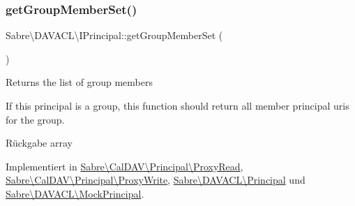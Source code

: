 \mbox{\label{interface_sabre_1_1_d_a_v_a_c_l_1_1_i_principal_ad9f9e4ed25ec5ec9325288b076cdd09f}} 
\subsubsection{\texorpdfstring{get\+Group\+Member\+Set()}{getGroupMemberSet()}}
{\footnotesize\ttfamily Sabre\textbackslash{}\+D\+A\+V\+A\+C\+L\textbackslash{}\+I\+Principal\+::get\+Group\+Member\+Set (\begin{DoxyParamCaption}{ }\end{DoxyParamCaption})}

Returns the list of group members

If this principal is a group, this function should return all member principal uri\textquotesingle{}s for the group.

\begin{DoxyReturn}{Rückgabe}
array 
\end{DoxyReturn}


Implementiert in \mbox{\hyperlink{class_sabre_1_1_cal_d_a_v_1_1_principal_1_1_proxy_read_a397ef7443da29e867f986b0fd1c498d6}{Sabre\textbackslash{}\+Cal\+D\+A\+V\textbackslash{}\+Principal\textbackslash{}\+Proxy\+Read}}, \mbox{\hyperlink{class_sabre_1_1_cal_d_a_v_1_1_principal_1_1_proxy_write_ab735c1ecf155a532a098a4618f499afa}{Sabre\textbackslash{}\+Cal\+D\+A\+V\textbackslash{}\+Principal\textbackslash{}\+Proxy\+Write}}, \mbox{\hyperlink{class_sabre_1_1_d_a_v_a_c_l_1_1_principal_afaa4afcbbaa47b295dd84e9e4e71ca25}{Sabre\textbackslash{}\+D\+A\+V\+A\+C\+L\textbackslash{}\+Principal}} und \mbox{\hyperlink{class_sabre_1_1_d_a_v_a_c_l_1_1_mock_principal_a1bbf28a5c948869c2f1d94571906b6e4}{Sabre\textbackslash{}\+D\+A\+V\+A\+C\+L\textbackslash{}\+Mock\+Principal}}.

\mbox{\label{interface_sabre_1_1_d_a_v_a_c_l_1_1_i_principal_a8921b6c6ba5421dd0a6f6ba26def6fbd}} 
